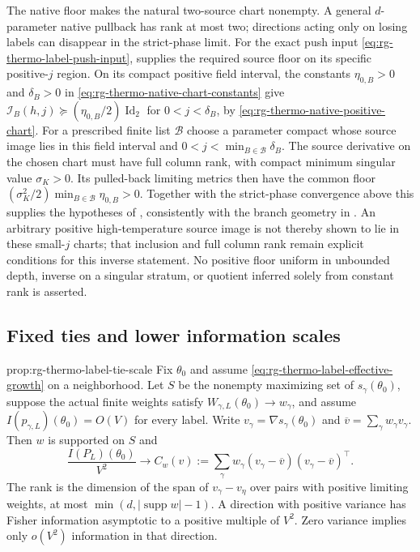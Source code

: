 The native floor makes the natural two-source chart nonempty. A general
$d$-parameter native pullback has rank at most two; directions acting
only on losing labels can disappear in the strict-phase limit. For the exact push input \cref{eq:rg-thermo-label-push-input},
 supplies the required
source floor on its specific positive-$j$ region. On its compact
positive field interval, the constants $\eta_{0,B}>0$ and $\delta_B>0$
in \cref{eq:rg-thermo-native-chart-constants} give
$\mathcal I_B(h,j)\succeq(\eta_{0,B}/2)\operatorname{Id}_2$ for
$0<j<\delta_B$, by \cref{eq:rg-thermo-native-positive-chart}.
For a prescribed finite list $\mathcal B$ choose a parameter compact
whose source image lies in this field interval and
$0<j<\min_{B\in\mathcal B}\delta_B$. The source derivative on the
chosen chart must have full column rank, with compact minimum singular
value $\sigma_K>0$. Its pulled-back limiting metrics then have the
common floor
$(\sigma_K^2/2)\min_{B\in\mathcal B}\eta_{0,B}>0$.
Together with the strict-phase convergence above this supplies the
hypotheses of , consistently
with the branch geometry in
. An arbitrary positive
high-temperature source image is not thereby shown to lie in these
small-$j$ charts; that inclusion and full column rank remain explicit
conditions for this inverse statement. No positive floor uniform in
unbounded depth, inverse on a singular stratum, or quotient inferred
solely from constant rank is asserted.

\subsection{Fixed ties and lower information scales}
\label{sec:rg-thermo-label-ties}

{prop:rg-thermo-label-tie-scale}
Fix $\theta_0$ and assume \cref{eq:rg-thermo-label-effective-growth} on
a neighborhood. Let $S$ be the nonempty maximizing set of
$s_\gamma(\theta_0)$, suppose the actual finite weights satisfy
$W_{\gamma,L}(\theta_0)\to w_\gamma$, and assume
$I(p_{\gamma,L})(\theta_0)=O(V)$ for every label. Write
$v_\gamma=\nabla s_\gamma(\theta_0)$ and
$\overline v=\sum_\gamma w_\gamma v_\gamma$. Then $w$ is supported on
$S$ and
\begin{equation}
 \frac{I(P_L)(\theta_0)}{V^2}
 \longrightarrow C_w(v)
 :=\sum_\gamma w_\gamma(v_\gamma-\overline v)
                            (v_\gamma-\overline v)^\top.
 \label{eq:rg-thermo-label-tie-limit}
\end{equation}
The rank is the dimension of the span of $v_\gamma-v_\eta$ over pairs
with positive limiting weights, at most
$\min(d,|\operatorname{supp}w|-1)$. A direction with positive variance
has Fisher information asymptotic to a positive multiple of $V^2$.
Zero variance implies only $o(V^2)$ information in that direction.\thermoestablishedstatus


